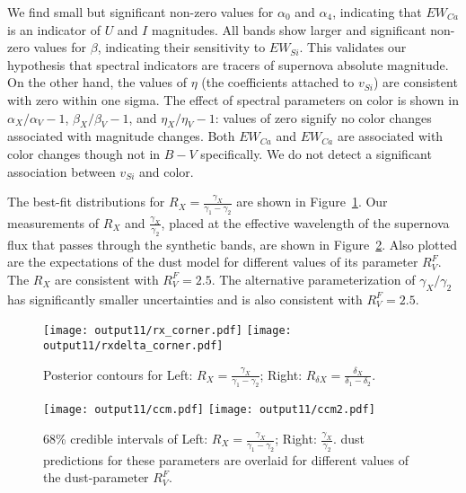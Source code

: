 \documentclass{aastex}   	%
\begin{document}
We find small but significant non-zero values for $\alpha_0$ and $\alpha_4$, indicating that $EW_{Ca}$ is an indicator of $U$ and $I$
magnitudes.  All bands show larger and significant non-zero values for $\beta$, indicating their sensitivity to
$EW_{Si}$.  This validates our hypothesis that spectral indicators
are tracers of supernova absolute magnitude.  On the other hand, the values of $\eta$ (the coefficients attached to $v_{Si}$) are consistent with zero within one sigma.
The effect of spectral parameters on color is shown in $\alpha_X/\alpha_V-1$,  $\beta_X/\beta_V-1$, and  $\eta_X/\eta_V-1$:
values of zero signify no color changes associated with magnitude changes.
Both $EW_{Ca}$ and $EW_{Ca}$ are associated with color changes though not in $B-V$ specifically.
We do not detect a significant association between
$v_{Si}$ and color.

The best-fit distributions for $R_X=\frac{\gamma_X}{\gamma_1-\gamma_2}$ are shown in Figure~\ref{rx:fig}.  
Our measurements of
$R_X$ and $\frac{\gamma_X}{\gamma_2}$, placed at the effective wavelength of the supernova flux that passes
through the synthetic bands, are shown in
Figure~\ref{ccm:fig}.
Also plotted are the expectations of the \citet{1999PASP..111...63F} dust model for different values of its parameter $R^F_V$.
The $R_X$ are consistent with  $R^F_V=2.5$.  The 
 alternative parameterization
 of $\gamma_X/\gamma_2$ has significantly smaller
uncertainties and is also consistent with $R^F_V=2.5$. 

\begin{figure}[htbp] %
   \centering
   \texttt{[image: output11/rx\_corner.pdf]}
      \texttt{[image: output11/rxdelta\_corner.pdf]} 
   \caption{Posterior contours for Left:  $R_X=\frac{\gamma_X}{\gamma_1-\gamma_2}$;  Right:  $R_{\delta X}=\frac{\delta_X}{\delta_1-\delta_2}$.
   \label{rx:fig}}
\end{figure}

\begin{figure}[htbp] %
   \centering
   \texttt{[image: output11/ccm.pdf]}
      \texttt{[image: output11/ccm2.pdf]} 
   \caption{68\% credible intervals of Left: $R_X=\frac{\gamma_X}{\gamma_1-\gamma_2}$; Right: $\frac{\gamma_X}{\gamma_2}$. 
   \citet{1999PASP..111...63F} dust
   predictions for these parameters are overlaid for different values of the dust-parameter $R^F_V$.
   \label{ccm:fig}}
\end{figure}
\end{document}
